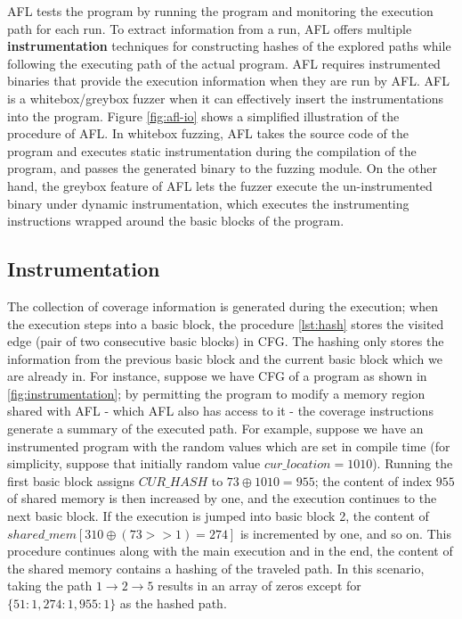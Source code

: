 AFL tests the program by running the program and monitoring the execution path for each run. To extract information from a run, AFL offers multiple \textbf{instrumentation} techniques for constructing hashes of the explored paths while following the executing path of the actual program. AFL requires instrumented binaries that provide the execution information when they are run by AFL. AFL is a whitebox/greybox fuzzer when it can effectively insert the instrumentations into the program. Figure \ref{fig:afl-io} shows a simplified illustration of the procedure of AFL. In whitebox fuzzing, AFL takes the source code of the program and executes static instrumentation during the compilation of the program, and passes the generated binary to the fuzzing module. On the other hand, the greybox feature of AFL lets the fuzzer execute the un-instrumented binary under dynamic instrumentation, which executes the instrumenting instructions wrapped around the basic blocks of the program.


\subsection{Instrumentation}
\label{subsec:instrumentation}

The collection of coverage information is generated during the execution; when the execution steps into a basic block, the procedure \ref{lst:hash} stores the visited edge (pair of two consecutive basic blocks) in CFG. The hashing only stores the information from the previous basic block and the current basic block which we are already in. For instance, suppose we have CFG of a program as shown in \ref{fig:instrumentation}; by permitting the program to modify a memory region shared with AFL - which AFL also has access to it - the coverage instructions generate a summary of the executed path. For example, suppose we have an instrumented program with the random values which are set in compile time (for simplicity, suppose that initially random value $cur\_location=1010$). Running the first basic block assigns $CUR\_HASH$ to $73\oplus1010=955$; the content of index $955$ of shared memory is then increased by one, and the execution continues to the next basic block. If the execution is jumped into basic block 2, the content of $shared\_mem[310\oplus(73>>1)=274]$ is incremented by one, and so on. This procedure continues along with the main execution and in the end, the content of the shared memory contains a hashing of the traveled path. In this scenario, taking the path $1\rightarrow2\rightarrow5$ results in an array of zeros except for $\{51: 1, 274: 1, 955: 1\}$ as the hashed path.

